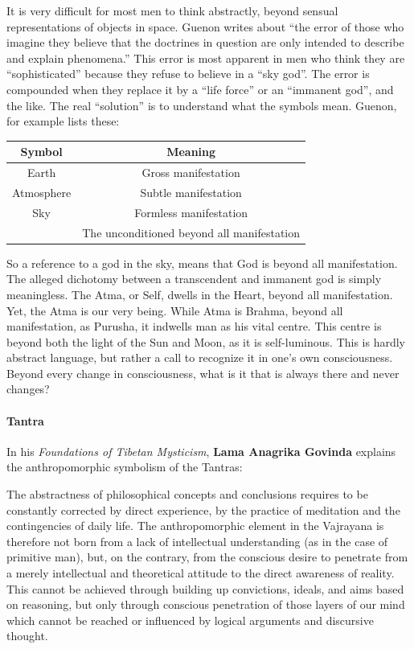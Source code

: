 It is very difficult for most men to think abstractly, beyond sensual representations of objects in space. Guenon writes about ``the error of those who imagine they believe that the doctrines in question are only intended to describe and explain phenomena.'' This error is most apparent in men who think they are ``sophisticated'' because they refuse to believe in a ``sky god''. The error is compounded when they replace it by a ``life force'' or an ``immanent god'', and the like. The real ``solution'' is to understand what the symbols mean. Guenon, for example lists these:

\begin{table}[h]\centering\small
\begin{tabular}{cc}\toprule
\textbf{Symbol} & \textbf{Meaning} \\\midrule Earth & Gross manifestation \\ Atmosphere & Subtle manifestation \\ Sky & Formless manifestation \\ & The unconditioned beyond all manifestation \\\bottomrule
\end{tabular}
\end{table}

So a reference to a god in the sky, means that God is beyond all manifestation. The alleged dichotomy between a transcendent and immanent god is simply meaningless. The Atma, or Self, dwells in the Heart, beyond all manifestation. Yet, the Atma is our very being. While Atma is Brahma, beyond all manifestation, as Purusha, it indwells man as his vital centre. This centre is beyond both the light of the Sun and Moon, as it is self-luminous. This is hardly abstract language, but rather a call to recognize it in one's own consciousness. Beyond every change in consciousness, what is it that is always there and never changes?

\paragraph{Tantra}


In his \textit{Foundations of Tibetan Mysticism}, \textbf{Lama Anagrika Govinda} explains the anthropomorphic symbolism of the Tantras:

\begin{quotex}
The abstractness of philosophical concepts and conclusions requires to be constantly corrected by direct experience, by the practice of meditation and the contingencies of daily life. The anthropomorphic element in the Vajrayana is therefore not born from a lack of intellectual understanding (as in the case of primitive man), but, on the contrary, from the conscious desire to penetrate from a merely intellectual and theoretical attitude to the direct awareness of reality. This cannot be achieved through building up convictions, ideals, and aims based on reasoning, but only through conscious penetration of those layers of our mind which cannot be reached or influenced by logical arguments and discursive thought.
\end{quotex}


